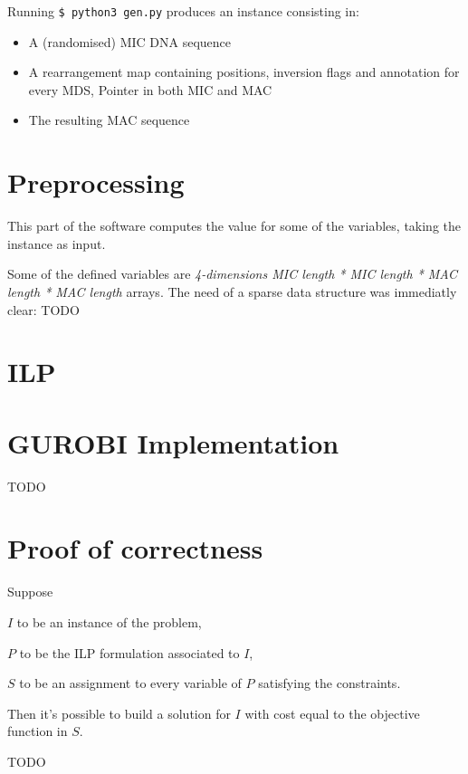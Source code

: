 Running \texttt{\$ python3 gen.py} produces an instance consisting in:

\begin{itemize}
	\item A (randomised) MIC DNA sequence
	\item A rearrangement map containing positions, inversion flags and annotation for every MDS, Pointer in both MIC and MAC
	\item The resulting MAC sequence
\end{itemize}

\section{Preprocessing}
This part of the software computes the value for some of the variables, taking the instance as input.

Some of the defined variables are \textit{4-dimensions MIC length * MIC length * MAC length * MAC length} arrays. The need of a sparse data structure was immediatly clear: TODO


\section{ILP}


\section{GUROBI Implementation}
TODO

\section{Proof of correctness}

\begin{lemma}
Suppose

$I$ to be an instance of the problem,

$P$ to be the ILP formulation associated to $I$,

$S$ to be an assignment to every variable of $P$ satisfying the constraints.

Then it's possible to build a solution for $I$ with cost equal to the objective function in $S$.
\end{lemma}

TODO